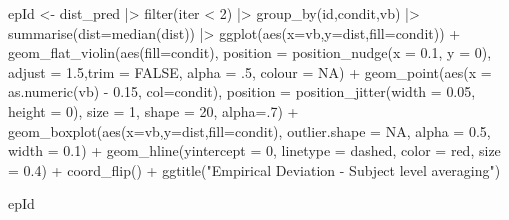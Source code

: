 \documentclass[
  letterpaper,
  DIV=11,
  numbers=noendperiod]{scrartcl}
\newenvironment{Shaded}{\begin{snugshade}}{\end{snugshade}}
\newcommand{\AttributeTok}[1]{\textcolor[rgb]{0.40,0.45,0.13}{#1}}
\newcommand{\ConstantTok}[1]{\textcolor[rgb]{0.56,0.35,0.01}{#1}}
\newcommand{\DecValTok}[1]{\textcolor[rgb]{0.68,0.00,0.00}{#1}}
\newcommand{\FloatTok}[1]{\textcolor[rgb]{0.68,0.00,0.00}{#1}}
\newcommand{\FunctionTok}[1]{\textcolor[rgb]{0.28,0.35,0.67}{#1}}
\newcommand{\NormalTok}[1]{\textcolor[rgb]{0.00,0.23,0.31}{#1}}
\newcommand{\OtherTok}[1]{\textcolor[rgb]{0.00,0.23,0.31}{#1}}
\newcommand{\SpecialCharTok}[1]{\textcolor[rgb]{0.37,0.37,0.37}{#1}}
\newcommand{\StringTok}[1]{\textcolor[rgb]{0.13,0.47,0.30}{#1}}
\begin{document}
\begin{Shaded}
\begin{Highlighting}[]
\NormalTok{epId }\OtherTok{\textless{}{-}}\NormalTok{ dist\_pred  }\SpecialCharTok{|\textgreater{}}
  \FunctionTok{filter}\NormalTok{(iter }\SpecialCharTok{\textless{}} \DecValTok{2}\NormalTok{)  }\SpecialCharTok{|\textgreater{}} \FunctionTok{group\_by}\NormalTok{(id,condit,vb) }\SpecialCharTok{|\textgreater{}}
  \FunctionTok{summarise}\NormalTok{(}\AttributeTok{dist=}\FunctionTok{median}\NormalTok{(dist)) }\SpecialCharTok{|\textgreater{}}
  \FunctionTok{ggplot}\NormalTok{(}\FunctionTok{aes}\NormalTok{(}\AttributeTok{x=}\NormalTok{vb,}\AttributeTok{y=}\NormalTok{dist,}\AttributeTok{fill=}\NormalTok{condit)) }\SpecialCharTok{+} 
  \FunctionTok{geom\_flat\_violin}\NormalTok{(}\FunctionTok{aes}\NormalTok{(}\AttributeTok{fill=}\NormalTok{condit), }\AttributeTok{position =} \FunctionTok{position\_nudge}\NormalTok{(}\AttributeTok{x =} \FloatTok{0.1}\NormalTok{, }\AttributeTok{y =} \DecValTok{0}\NormalTok{),}
                   \AttributeTok{adjust =} \FloatTok{1.5}\NormalTok{,}\AttributeTok{trim =} \ConstantTok{FALSE}\NormalTok{, }\AttributeTok{alpha =}\NormalTok{ .}\DecValTok{5}\NormalTok{, }\AttributeTok{colour =} \ConstantTok{NA}\NormalTok{) }\SpecialCharTok{+}
  \FunctionTok{geom\_point}\NormalTok{(}\FunctionTok{aes}\NormalTok{(}\AttributeTok{x =} \FunctionTok{as.numeric}\NormalTok{(vb) }\SpecialCharTok{{-}} \FloatTok{0.15}\NormalTok{, }\AttributeTok{col=}\NormalTok{condit),}
             \AttributeTok{position =} \FunctionTok{position\_jitter}\NormalTok{(}\AttributeTok{width =} \FloatTok{0.05}\NormalTok{, }\AttributeTok{height =} \DecValTok{0}\NormalTok{),}
             \AttributeTok{size =} \DecValTok{1}\NormalTok{, }\AttributeTok{shape =} \DecValTok{20}\NormalTok{, }\AttributeTok{alpha=}\NormalTok{.}\DecValTok{7}\NormalTok{) }\SpecialCharTok{+}
  \FunctionTok{geom\_boxplot}\NormalTok{(}\FunctionTok{aes}\NormalTok{(}\AttributeTok{x=}\NormalTok{vb,}\AttributeTok{y=}\NormalTok{dist,}\AttributeTok{fill=}\NormalTok{condit),}
               \AttributeTok{outlier.shape =} \ConstantTok{NA}\NormalTok{,}
               \AttributeTok{alpha =} \FloatTok{0.5}\NormalTok{, }\AttributeTok{width =} \FloatTok{0.1}\NormalTok{) }\SpecialCharTok{+}
  \FunctionTok{geom\_hline}\NormalTok{(}\AttributeTok{yintercept =} \DecValTok{0}\NormalTok{,}
             \AttributeTok{linetype =} \StringTok{\textquotesingle{}dashed\textquotesingle{}}\NormalTok{,}
             \AttributeTok{color =} \StringTok{\textquotesingle{}red\textquotesingle{}}\NormalTok{,}
             \AttributeTok{size =} \FloatTok{0.4}\NormalTok{) }\SpecialCharTok{+} 
  \FunctionTok{coord\_flip}\NormalTok{() }\SpecialCharTok{+} \FunctionTok{ggtitle}\NormalTok{(}\StringTok{"Empirical Deviation {-} Subject level averaging"}\NormalTok{) }



\NormalTok{epId }
\end{Highlighting}
\end{Shaded}
\end{document}
